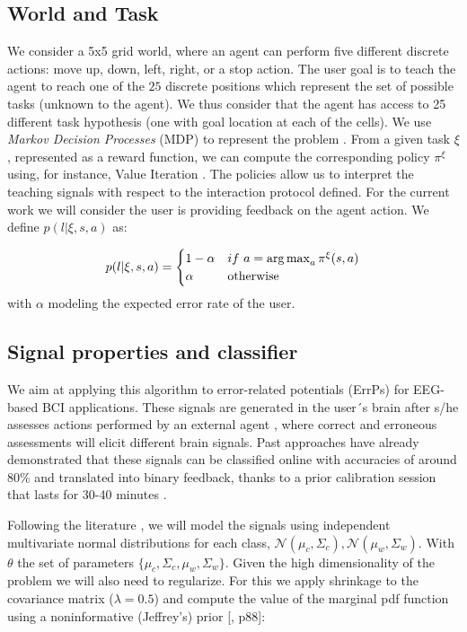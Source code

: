 \subsection{World and Task}
We consider a 5x5 grid world, where an agent can perform five different discrete actions: move up, down, left, right, or a stop action. The user goal is to teach the agent to reach one of the $25$ discrete positions which represent the set of possible tasks (unknown to the agent). We thus consider that the agent has access to 25 different task hypothesis (one with goal location at each of the cells). We use \textit{Markov Decision Processes} (MDP) to represent the problem \cite{sutton1998reinforcement}. From a given task $\xi$, represented as a reward function, we can compute the corresponding policy $\pi^{\xi}$ using, for instance, Value Iteration \cite{sutton1998reinforcement}. The policies allow us to interpret the teaching signals with respect to the interaction protocol defined. For the current work we will consider the user is providing feedback on the agent action. We define $p(l | \xi, s, a)$ as:

\begin{equation*}
    p(l | \xi, s, a) = 
    \begin{cases}
    1-\alpha               & if~a = \argmax_a \pi^{\xi}(s,a)\\
        \alpha             & \text{otherwise}\\
   \end{cases}
\end{equation*}
with $\alpha$ modeling the expected error rate of the user. 

\subsection{Signal properties and classifier}

We aim at applying this algorithm to error-related potentials (ErrPs) for EEG-based BCI applications. These signals are generated in the user´s brain after s/he assesses actions performed by an external agent \cite{chavarriaga2010learning}, where correct and erroneous assessments will elicit different brain signals. Past approaches have already demonstrated that these signals can be classified online with accuracies of around 80\% and translated into binary feedback, thanks to a prior calibration session that lasts for 30-40 minutes \cite{chavarriaga2010learning, iturrate2013task}.

Following the literature \cite{blankertz2010single}, we will model the signals using independent multivariate normal distributions for each class, $\mathcal{N}(\mu_c, \Sigma_c), \mathcal{N}(\mu_w, \Sigma_w)$. With $\theta$ the set of parameters $\{\mu_c, \Sigma_c,\mu_w, \Sigma_w\}$. Given the high dimensionality of the problem we will also need to regularize. For this we apply shrinkage to the covariance matrix ($\lambda = 0.5$) and compute the value of the marginal pdf function using a noninformative (Jeffrey's) prior [\cite{gelman2003bayesian}, p88]:

